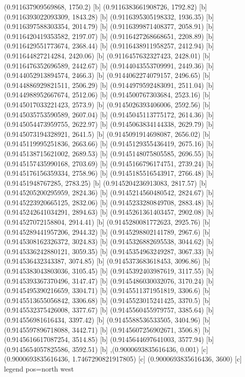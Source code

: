 {{{(0.911637909569868, 1750.2) [b] 
(0.9116383661908726, 1792.82) [b] 
(0.9116393022093309, 1843.28) [b] 
(0.9116395305198332, 1936.35) [b] 
(0.9116397588303354, 2014.79) [b] 
(0.9116399871408377, 2058.91) [b] 
(0.9116420419353582, 2197.07) [b] 
(0.9116427268668651, 2208.89) [b] 
(0.9116429551773674, 2368.44) [b] 
(0.9116438911958257, 2412.94) [b] 
(0.911644827214284, 2420.06) [b] 
(0.9116457632327423, 2428.01) [b] 
(0.9116476352696589, 2442.67) [b] 
(0.9144043553709991, 2449.36) [b] 
(0.9144052913894574, 2466.3) [b] 
(0.9144062274079157, 2496.65) [b] 
(0.9144886929821511, 2506.29) [b] 
(0.9144979592483091, 2511.04) [b] 
(0.9144988952667674, 2512.06) [b] 
(0.914500767303684, 2523.16) [b] 
(0.9145017033221423, 2573.9) [b] 
(0.9145026393406006, 2592.56) [b] 
(0.9145035753590589, 2607.04) [b] 
(0.9145045113775172, 2614.36) [b] 
(0.9145054473959755, 2622.97) [b] 
(0.9145063834144338, 2629.79) [b] 
(0.9145073194328921, 2641.5) [b] 
(0.9145091914698087, 2656.02) [b] 
(0.9145119995251836, 2663.66) [b] 
(0.9145129355436419, 2675.16) [b] 
(0.9145138715621002, 2689.53) [b] 
(0.9145148075805585, 2696.55) [b] 
(0.9145157435990168, 2703.69) [b] 
(0.9145166796174751, 2739.24) [b] 
(0.9145176156359334, 2758.96) [b] 
(0.9145185516543917, 2766.48) [b] 
(0.91451948767285, 2783.25) [b] 
(0.9145204236913083, 2817.57) [b] 
(0.9145205200295959, 2824.36) [b] 
(0.9145214560480542, 2824.67) [b] 
(0.9145223920665125, 2832.06) [b] 
(0.9145233280849708, 2883.48) [b] 
(0.9145242641034291, 2894.63) [b] 
(0.9145261361403457, 2902.08) [b] 
(0.914527072158804, 2914.41) [b] 
(0.9145280081772623, 2925.76) [b] 
(0.9145289441957206, 2944.32) [b] 
(0.9145298802141789, 2967.6) [b] 
(0.9145308162326372, 3024.83) [b] 
(0.9145326882695538, 3044.62) [b] 
(0.9145336242880121, 3059.35) [b] 
(0.9145354963249287, 3067.33) [b] 
(0.914536432343387, 3074.85) [b] 
(0.9145373683618453, 3096.86) [b] 
(0.9145383043803036, 3105.45) [b] 
(0.9145392403987619, 3117.55) [b] 
(0.9145393367370496, 3147.47) [b] 
(0.9145486030032076, 3170.24) [b] 
(0.9145495390216659, 3304.71) [b] 
(0.9145511371951819, 3306.6) [b] 
(0.9145513655056842, 3306.68) [b] 
(0.9145523015241425, 3370.5) [b] 
(0.9145532375426008, 3377.67) [b] 
(0.9145560455979757, 3385.64) [b] 
(0.914556981616434, 3397.42) [b] 
(0.9145588536533505, 3404.96) [b] 
(0.9145597896718088, 3442.71) [b] 
(0.9145607256902671, 3506.8) [b] 
(0.9145616617087254, 3514.85) [b] 
(0.9145644697641003, 3577.94) [b] 
(0.9145654057825586, 3592.51) [b] 
},{(0.9000693835616436, 0.001) [c] 
(0.9000693835616436, 1.7467290821917805) [c] 
(0.9000693835616436, 3600) [c] 
}}}{legend pos=north west}